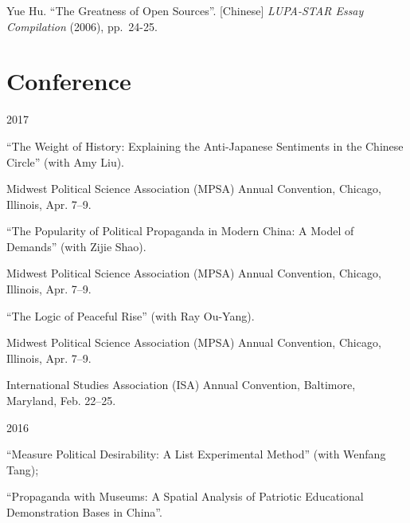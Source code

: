 \documentclass[10.5pt,]{article}
\providecommand{\tightlist}{%
  \setlength{\itemsep}{0pt}\setlength{\parskip}{0pt}}
\renewenvironment{itemize}{
  \begin{list}{}{
    \setlength{\leftmargin}{1.5em}
  }
}{
  \end{list}
}
\begin{document}
Yue Hu. ``The Greatness of Open Sources''. {[}Chinese{]}
\emph{LUPA-STAR Essay Compilation} (2006), pp.~24-25.

\section{Conference}\label{conference}

\begin{itemize}
\tightlist
\item
  2017

  \begin{itemize}
  \tightlist
  \item
    ``The Weight of History: Explaining the Anti-Japanese Sentiments in
    the Chinese Circle'' (with Amy Liu).

    \begin{itemize}
    \tightlist
    \item
      \footnotesize Midwest Political Science Association (MPSA) Annual
      Convention, Chicago, Illinois, Apr. 7--9.
    \end{itemize}
  \item
    ``The Popularity of Political Propaganda in Modern China: A Model of
    Demands'' (with Zijie Shao).

    \begin{itemize}
    \tightlist
    \item
      \footnotesize Midwest Political Science Association (MPSA) Annual
      Convention, Chicago, Illinois, Apr. 7--9.
    \end{itemize}
  \item
    ``The Logic of Peaceful Rise'' (with Ray Ou-Yang).

    \begin{itemize}
    \tightlist
    \item
      \footnotesize Midwest Political Science Association (MPSA) Annual
      Convention, Chicago, Illinois, Apr. 7--9.
    \item
      \footnotesize International Studies Association (ISA) Annual
      Convention, Baltimore, Maryland, Feb. 22--25.
    \end{itemize}
  \end{itemize}
\item
  2016

  \begin{itemize}
  \tightlist
  \item
    ``Measure Political Desirability: A List Experimental Method'' (with
    Wenfang Tang);
  \item
    ``Propaganda with Museums: A Spatial Analysis of Patriotic
    Educational Demonstration Bases in China''.


\end{itemize}
\end{itemize}
\end{document}
